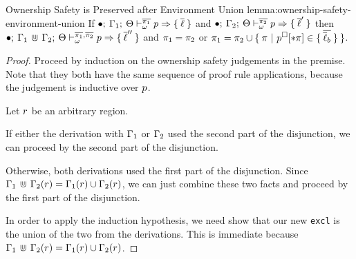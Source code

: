 \begin{oxlemma}{Ownership Safety is Preserved after Environment Union}
  {lemma:ownership-safety-environment-union} If
  $\bullet; \: \Gamma_1; \: \Theta \vdash^{\overline{\pi_1}}_{\omega} p \Rightarrow \{ \: \overline{\ell} \: \}$
  and
  $\bullet; \: \Gamma_2; \: \Theta \vdash^{\overline{\pi_2}}_{\omega} p \Rightarrow \{ \: \overline{\ell}^\prime \: \}$
  then $\bullet; \: \Gamma_1 \, \Cup \,
    \Gamma_2; \: \Theta \vdash^{\overline{\pi_1},\overline{\pi_2}}_{\omega} p \Rightarrow \{ \: \overline{\ell}^{\prime\prime} \: \}$
  and $\pi_1 = \pi_2$ or $\pi_1 = \pi_2 \cup \{ \: \pi
    \ | \ p^\square[* \pi] \in
    \{ \: \overline{\overline{\ell}_b} \: \} \: \}$.
\end{oxlemma}
\begin{proof}
  Proceed by induction on the ownership safety judgements in the premise. Note
  that they both have the same sequence of proof rule applications, because the
  judgement is inductive over $p$.
 
  \vspace{1em}
  \noindent \framebox[\textwidth]{ \figuresize
    \begin{mathpar}
      \OSafePlace
    \end{mathpar}
  } \vspace{1em}

  Let $r$ be an arbitrary region.

  If either the derivation with
  $\Gamma_1$ or $\Gamma_2$ used the second part of the disjunction, we can
  proceed by the second part of the disjunction.

  Otherwise, both derivations used the first part of the disjunction. Since
  $\Gamma_1 \, \Cup \, \Gamma_2(r) = \Gamma_1(r) \cup
  \Gamma_2(r)$, we can just combine these two facts and proceed by the
  first part of the disjunction.

  \vspace{1em}
  \noindent \framebox[\textwidth]{ \figuresize
    \begin{mathpar}
      \ODeref
    \end{mathpar}
  } \vspace{1em}

  In order to apply the induction hypothesis, we need show that our new
  \texttt{excl} is the union of the two from the derivations. This is immediate
  because $\Gamma_1 \, \Cup \, \Gamma_2(r) =
  \Gamma_1(r) \cup \Gamma_2(r)$.


\end{proof}
